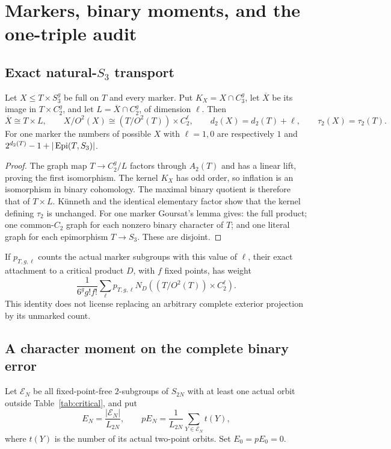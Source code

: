 \section{Markers, binary moments, and the one-triple audit}
\label{sec:markers}
\subsection{Exact natural-\texorpdfstring{$S_3$}{S3} transport}
\begin{proposition}\label{prop:marker-transport}
Let $X\leq T\times S_3^g$ be full on $T$ and every marker. Put
$K_X=X\cap C_3^g$, let $\overline X$ be its image in
$T\times C_2^g$, and let $L=\overline X\cap C_2^g$, of dimension
$\ell$. Then
\[
 \overline X\cong T\times L,\qquad
 X/O^2(X)\cong(T/O^2(T))\times C_2^\ell,
 \qquad d_2(X)=d_2(T)+\ell,\qquad \tau_2(X)=\tau_2(T).
\]
For one marker the numbers of possible $X$ with $\ell=1,0$ are
respectively $1$ and $2^{d_2(T)}-1+|\operatorname{Epi}(T,S_3)|$.
\end{proposition}
\begin{proof}
The graph map $T\to C_2^g/L$ factors through $A_2(T)$ and has a
linear lift, proving the first isomorphism. The kernel $K_X$ has odd
order, so inflation is an isomorphism in binary cohomology. The maximal
binary quotient is therefore that of $T\times L$. K\"unneth and the
identical elementary factor show that the kernel defining $\tau_2$
is unchanged. For one marker Goursat's lemma gives: the full product;
one common-$C_2$ graph for each nonzero binary character of $T$; and
one literal graph for each epimorphism $T\to S_3$. These are disjoint.
\end{proof}

If $p_{T,g,\ell}$ counts the actual marker subgroups with this value of
$\ell$, their exact attachment to a critical product $D$, with $f$
fixed points, has weight
\begin{equation}\label{eq:marker-terminal}
 \frac{1}{6^gg!f!}\sum_\ell p_{T,g,\ell}
             N_D((T/O^2(T))\times C_2^\ell).
\end{equation}
This identity does not license replacing an arbitrary complete exterior
projection by its unmarked count.

\subsection{A character moment on the complete binary error}
Let $\mathcal E_N$ be all fixed-point-free $2$-subgroups of $S_{2N}$
with at least one actual orbit outside Table~\ref{tab:critical}, and put
\[
 E_N=\frac{|\mathcal E_N|}{L_{2N}},\qquad
 pE_N=\frac1{L_{2N}}\sum_{Y\in\mathcal E_N}t(Y),
\]
where $t(Y)$ is the number of its actual two-point orbits.
Set $E_0=pE_0=0$.

